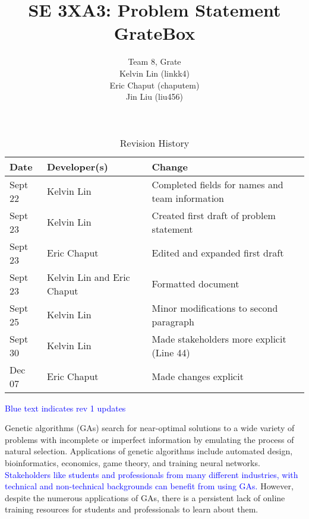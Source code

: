 \documentclass{article}
\title{SE 3XA3: Problem Statement\\GrateBox}
\author{Team 8, Grate
		\\ Kelvin Lin (linkk4)
		\\ Eric Chaput (chaputem)
		\\ Jin Liu (liu456)
}
\date{}
\begin{document}
\begin{table}[hp]
\color{blue}
\caption{Revision History} \label{TblRevisionHistory}
\begin{tabularx}{\textwidth}{llX}
\toprule
\textbf{Date} & \textbf{Developer(s)} & \textbf{Change}\\
\midrule
Sept 22 & Kelvin Lin & Completed fields for names and team information\\
Sept 23 & Kelvin Lin & Created first draft of problem statement\\
Sept 23 & Eric Chaput & Edited and expanded first draft\\
Sept 23 & Kelvin Lin and Eric Chaput& Formatted document\\
Sept 25 & Kelvin Lin & Minor modifications to second paragraph\\
Sept 30 & Kelvin Lin & Made stakeholders more explicit (Line 44)\\
Dec 07 & Eric Chaput & Made changes explicit\\
\bottomrule
\end{tabularx}
\end{table}

\newpage
\color{black}
\maketitle

\textcolor{blue}{Blue text indicates rev 1 updates}

Genetic algorithms (GAs) search for near-optimal solutions to a wide variety of 
problems with incomplete or imperfect information by emulating the process of 
natural selection. Applications of genetic algorithms include automated design, 
bioinformatics, economics, game theory, and training neural networks. 
\textcolor{blue}{Stakeholders like students 
and professionals from many different industries, with technical and 
non-technical backgrounds can benefit from using GAs.} However, despite the 
numerous applications of GAs, there is a persistent lack of online training 
resources for students and professionals to learn about them. 
\end{document}

